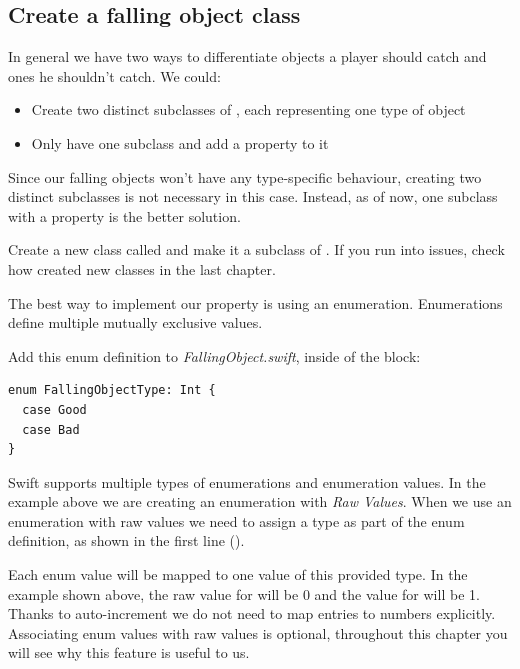 \subsection{Create a falling object class}
In general we have two ways to differentiate objects a player should catch and
ones he shouldn't catch. We could:
\begin{itemize}
  \item Create two distinct subclasses of \ccsprite{}, each representing one
  type of object
  \item Only have one subclass and add a  property to it
\end{itemize}
Since our falling objects won't have any type-specific behaviour, creating two
distinct subclasses is not necessary in this case. Instead, as of now, one
subclass with a  property is the better solution.

\begin{leftbar}
Create a new class called  and make it a subclass
of \ccsprite{}. If you run into issues, check how created new classes in the
last chapter.
\end{leftbar}

The best way to implement our  property is using an 
enumeration. Enumerations define multiple mutually exclusive values.

\begin{leftbar}
Add this enum definition to \textit{FallingObject.swift},
inside of the  block:

\begin{lstlisting}
enum FallingObjectType: Int {
  case Good
  case Bad
}
\end{lstlisting}
\end{leftbar}

Swift supports multiple types of enumerations and enumeration values.
In the example above we are creating an enumeration with \textit{Raw Values}.
When we use an enumeration with raw values we need to assign a type as part of
the enum definition, as shown in the first line (). 

Each enum value will be mapped to one value of this
provided type. In the example shown above, the raw value for
 will be 0 and the value for
 will be 1. Thanks to auto-increment we do not
need to map entries to numbers explicitly. Associating enum values with raw values is optional,
throughout this chapter you will see why this feature is useful to us.

